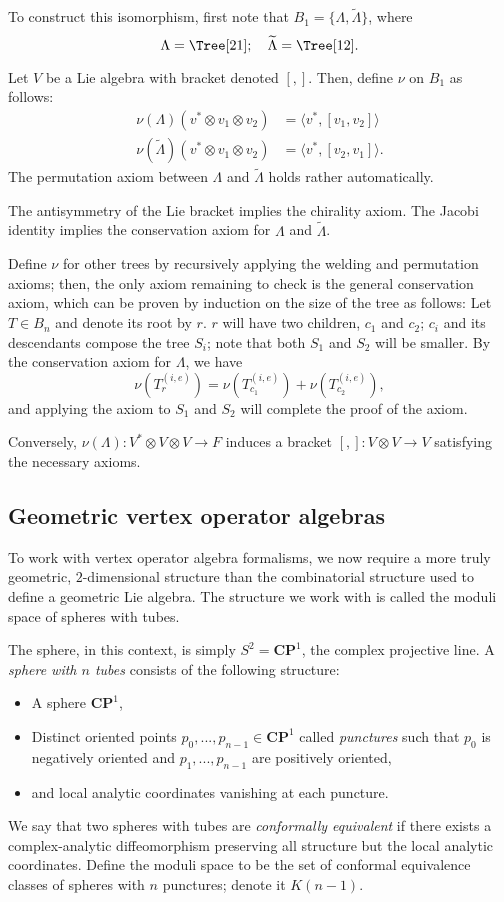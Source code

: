 \documentclass{article}
\newcommand{\CP}{\mathbold{CP}}
\begin{document}
To construct this isomorphism, first note that $B_1=\{\Lambda,\widetilde{\Lambda}\}$, where
\[\Lambda=\Tree[ 2 1 ]; \quad \widetilde{\Lambda}=\Tree[ 1 2 ]. \]

Let $V$ be a Lie algebra with bracket denoted $[,]$.  Then, define $\nu$ on $B_1$ as follows:
\begin{align}
  \nu(\Lambda)(v^* \otimes v_1 \otimes v_2)&=\langle v^*,[v_1,v_2] \rangle\\
  \nu(\widetilde{\Lambda})(v^* \otimes v_1 \otimes v_2)&=\langle v^*,[v_2,v_1] \rangle.
\end{align}
The permutation axiom between $\Lambda$ and $\widetilde{\Lambda}$ holds rather automatically.

The antisymmetry of the Lie bracket implies the chirality axiom.  The Jacobi identity implies the conservation axiom for $\Lambda$ and $\widetilde{\Lambda}$.

Define $\nu$ for other trees by recursively applying the welding and permutation axioms; then, the only axiom remaining to check is the general conservation axiom, which can be proven by induction on the size of the tree as follows: Let $T \in B_n$ and denote its root by $r$.  $r$ will have two children, $c_1$ and $c_2$; $c_i$ and its descendants compose the tree $S_i$; note that both $S_1$ and $S_2$ will be smaller.  By the conservation axiom for $\Lambda$, we have
\[\nu(T^{(i,e)}_r)=\nu(T^{(i,e)}_{c_1})+\nu(T^{(i,e)}_{c_2}), \]
and applying the axiom to $S_1$ and $S_2$ will complete the proof of the axiom.

Conversely, $\nu(\Lambda):V^* \otimes V \otimes V \rightarrow F$ induces a bracket $[,]: V \otimes V \rightarrow V$ satisfying the necessary axioms.
\subsection{Geometric vertex operator algebras}
To work with vertex operator algebra formalisms, we now require a more truly geometric, $2$-dimensional structure than the combinatorial structure used to define a geometric Lie algebra.  The structure we work with is called the moduli space of spheres with tubes.

The sphere, in this context, is simply $S^2=\CP^1$, the complex projective line.  A \textit{sphere with $n$ tubes} consists of the following structure:
\begin{itemize}
\item A sphere $\CP^1$,
\item Distinct oriented points $p_0,...,p_{n-1} \in \CP^1$ called \textit{punctures} such that $p_0$ is negatively oriented and $p_1,...,p_{n-1}$ are positively oriented,
\item and local analytic coordinates vanishing at each puncture.
\end{itemize}
We say that two spheres with tubes are \textit{conformally equivalent} if there exists a complex-analytic diffeomorphism preserving all structure but the local analytic coordinates.  Define the moduli space to be the set of conformal equivalence classes of spheres with $n$ punctures; denote it $K(n-1)$.
\end{document}
